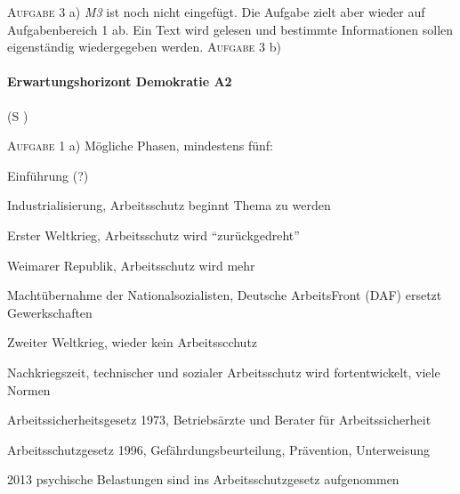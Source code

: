 \textsc{Aufgabe 3} a) \emph{M3} ist noch nicht eingefügt. Die Aufgabe zielt aber wieder auf Aufgabenbereich 1 ab. Ein Text wird gelesen und bestimmte Informationen sollen eigenständig wiedergegeben werden. 
\textsc{Aufgabe 3} b)


\paragraph{Erwartungshorizont Demokratie A2} (\gls{S} \pageref{DEMOKRATIE-A2})

\textsc{Aufgabe 1} a) \quad Mögliche Phasen, mindestens fünf: 
\begin{myenumerate}
    \item Einführung (?)
    \item Industrialisierung, Arbeitsschutz beginnt Thema zu werden %

    \item Erster Weltkrieg, Arbeitsschutz wird \enquote{zurückgedreht}
    \item Weimarer Republik, Arbeitsschutz wird mehr
    \item Machtübernahme der Nationalsozialisten, Deutsche ArbeitsFront (DAF) ersetzt Gewerkschaften
    \item Zweiter Weltkrieg, wieder kein Arbeitsscchutz
    \item Nachkriegszeit, technischer und sozialer Arbeitsschutz wird fortentwickelt, viele Normen
    \item Arbeitssicherheitsgesetz 1973, Betriebsärzte und Berater für Arbeitssicherheit 
    \item Arbeitsschutzgesetz 1996, Gefährdungsbeurteilung, Prävention, Unterweisung
    \item 2013 psychische Belastungen sind ins Arbeitsschutzgesetz aufgenommen
\end{myenumerate}


